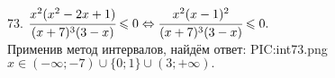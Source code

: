 73. $\cfrac{x^2(x^2-2x+1)}{(x+7)^3(3-x)}\leqslant0\Leftrightarrow\cfrac{x^2(x-1)^2}{(x+7)^3(3-x)}\leqslant0.$\\ Применив метод интервалов, найдём ответ:
{{PIC:int73.png}}
$x\in(-\infty;-7)\cup\{0;1\}\cup(3;+\infty).$\\
